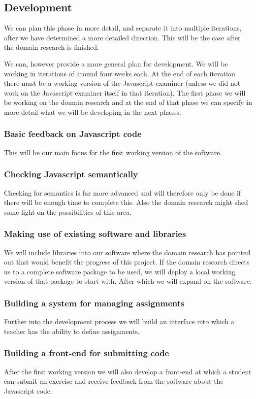 \documentclass{article}
\begin{document}
\subsection{Development} 

We can plan this phase in more detail, and separate it into multiple iterations,
after we have determined a more detailed direction. This will be the case after
the domain research is finished.

We can, however provide a more general plan for development. We will be working 
in iterations of around four weeks each. At the end of each iteration there must 
be a working version of the Javascript examiner (unless we did not work on the 
Javascript examiner itself in that iteration). The first phase we will be 
working on the domain research and at the end of that phase we can specify in 
more detail what we will be developing in the next phases. 

\subsubsection{Basic feedback on Javascript code} This will be 
our main focus for the first working version of the software. 
\subsubsection{Checking Javascript semantically} Checking for semantics is far 
more advanced and will therefore only be done if there will be enough time to 
complete this. Also the domain research might shed some light on the 
possibilities of this area. \subsubsection{Making use of existing software and 
libraries} We will include libraries into our software where the domain research 
has pointed out that would benefit the progress of this project. If the domain 
research directs us to a complete software package to be used, we will deploy a 
local working version of that package to start with. After which we will expand 
on the software. \subsubsection{Building a system for managing assignments} 
Further into the development process we will build an interface into which a 
teacher has the ability to define assignments. \subsubsection{Building a 
front-end for submitting code} After the first working version we will also 
develop a front-end at which a student can submit an exercise and receive 
feedback from the software about the Javascript code. 
\end{document}
